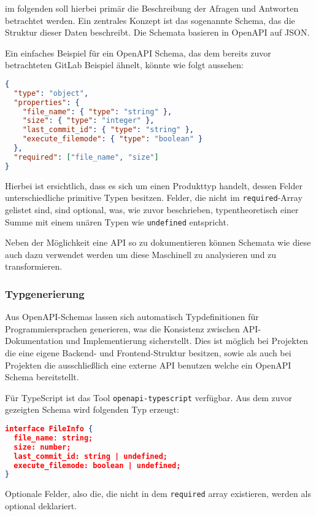 im folgenden soll hierbei primär die Beschreibung der Afragen und Antworten betrachtet werden.
Ein zentrales Konzept ist das sogenannte Schema, das die Struktur dieser Daten beschreibt. 
Die Schemata basieren in OpenAPI auf JSON.

Ein einfaches Beispiel für ein OpenAPI Schema, das dem bereits zuvor betrachteten GitLab Beispiel ähnelt, könnte wie folgt aussehen:

\begin{lstlisting}[language=json]
{
  "type": "object",
  "properties": {
    "file_name": { "type": "string" },
    "size": { "type": "integer" },
    "last_commit_id": { "type": "string" },
    "execute_filemode": { "type": "boolean" }
  },
  "required": ["file_name", "size"]
}
\end{lstlisting}

Hierbei ist ersichtlich, dass es sich um einen Produkttyp handelt,
dessen Felder unterschiedliche primitive Typen besitzen.
Felder, die nicht im \texttt{required}-Array gelistet sind, sind optional, was, wie zuvor beschrieben,
typentheoretisch einer Summe mit einem unären Typen wie \texttt{undefined} entspricht.

Neben der Möglichkeit eine API so zu dokumentieren können Schemata wie diese auch dazu verwendet werden
um diese Maschinell zu analysieren und zu transformieren.

\subsubsection{Typgenerierung}

Aus OpenAPI-Schemas lassen sich automatisch Typdefinitionen für Programmiersprachen generieren, 
was die Konsistenz zwischen API-Dokumentation und Implementierung sicherstellt.
Dies ist möglich bei Projekten die eine eigene Backend- und Frontend-Struktur besitzen, sowie als auch
bei Projekten die ausschließlich eine externe API benutzen welche ein OpenAPI Schema bereitstellt.

Für TypeScript ist das Tool \texttt{openapi-typescript} verfügbar.
Aus dem zuvor gezeigten Schema wird folgenden Typ erzeugt:
\begin{lstlisting}[language=json]
interface FileInfo {
  file_name: string;
  size: number;
  last_commit_id: string | undefined;
  execute_filemode: boolean | undefined;
}
\end{lstlisting}
Optionale Felder, also die, die nicht in dem \texttt{required} array existieren, werden als optional deklariert.

